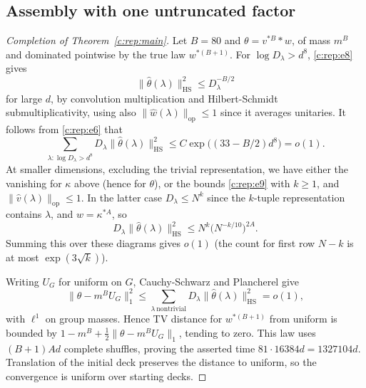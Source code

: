 \subsection{Assembly with one untruncated factor} \label{c:rep:assembly}
\begin{proof}[Completion of Theorem~\ref{c:rep:main}]
Let \(B=80\) and \(\theta=v^{*B}* w\), of mass \(m^B\) and dominated pointwise by the true law
\(w^{*(B+1)}\). For \(\log D_\lambda>d^8\), \eqref{c:rep:e8} gives
\[
\|\widehat\theta(\lambda)\|_{\mathrm{HS}}^2\le D_\lambda^{-B/2}
\]
for large \(d\), by convolution multiplication and Hilbert-Schmidt submultiplicativity, using
also \(\|\widehat w(\lambda)\|_{\mathrm{op}}\le 1\) since it averages unitaries. It follows
from \eqref{c:rep:e6} that
\[
\sum_{\lambda:\log D_\lambda>d^8}D_\lambda \|\widehat\theta(\lambda)\|_{\mathrm{HS}}^2
\le C \exp\big((33-B/2)d^8\big)=o(1).
\]
At smaller dimensions, excluding the trivial representation, we have either the vanishing for
\(\kappa\) above (hence for \(\theta\)), or the bounds \eqref{c:rep:e9} with \(k\ge 1\), and
\(\|\widehat v(\lambda)\|_{\mathrm{op}}\le 1\). In the latter case \(D_\lambda\le N^k\) since
the \(k\)-tuple representation contains \(\lambda\), and \(w=\kappa^{*A}\), so
\[
D_\lambda \|\widehat\theta(\lambda)\|_{\mathrm{HS}}^2
\le N^k\big(N^{-k/10}\big)^{2A}.
\]
Summing this over these diagrams gives \(o(1)\) (the count for first row \(N-k\) is at most
\(\exp(3\sqrt k)\)).

Writing \(U_G\) for uniform on \(G\), Cauchy-Schwarz and Plancherel give
\[
\|\theta-m^B U_G\|_1^2
\le \sum_{\lambda\ \mathrm{nontrivial}}D_\lambda\|\widehat\theta(\lambda)\|_{\mathrm{HS}}^2
=o(1),
\]
with \(\ell^1\) on group masses. Hence TV distance for \(w^{*(B+1)}\) from uniform is bounded
by \(1-m^B+\tfrac12\|\theta-m^B U_G\|_1\), tending to zero. This law uses \((B+1)A d\) complete
shuffles, proving the asserted time $81\cdot16384d=1327104d$. Translation of the initial deck
preserves the distance to uniform, so the convergence is uniform over starting decks.
\end{proof}
